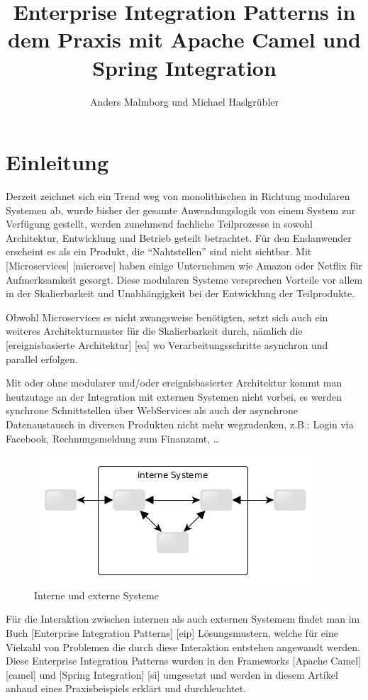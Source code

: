\documentclass[12pt,a4paper,ngerman]{article}
\title{Enterprise Integration Patterns in dem Praxis mit Apache Camel
und Spring Integration}
\author{Anders Malmborg und Michael Haslgrübler}
\date{}
\makeatletter
\def\maxwidth{\ifdim\Gin@nat@width>\linewidth\linewidth
\else\Gin@nat@width\fi}
\let\Oldincludegraphics\includegraphics
\renewcommand{\includegraphics}[1]{\Oldincludegraphics[width=\maxwidth]{#1}}
\makeatother
\begin{document}
\maketitle

\section{Einleitung}

Derzeit zeichnet sich ein Trend weg von monolithischen in Richtung
modularen Systemen ab, wurde bisher der gesamte Anwendungslogik von
einem System zur Verfügung gestellt, werden zunehmend fachliche
Teilprozesse in sowohl Architektur, Entwicklung und Betrieb geteilt
betrachtet. Für den Endanwender erscheint es als ein Produkt, die
``Nahtstellen'' sind nicht sichtbar. Mit {[}Microservices{]}
{[}microsvc{]} haben einige Unternehmen wie Amazon oder Netflix für
Aufmerksamkeit gesorgt. Diese modularen Systeme versprechen Vorteile vor
allem in der Skalierbarkeit und Unabhängigkeit bei der Entwicklung der
Teilprodukte.

Obwohl Microservices es nicht zwangsweise benötigten, setzt sich auch
ein weiteres Architekturmuster für die Skalierbarkeit durch, nämlich die
{[}ereignisbasierte Architektur{]} {[}ea{]} wo Verarbeitungsschritte
asynchron und parallel erfolgen.

Mit oder ohne modularer und/oder ereignisbasierter Architektur kommt man
heutzutage an der Integration mit externen Systemen nicht vorbei, es
werden synchrone Schnittstellen über WebServices als auch der asynchrone
Datenaustausch in diversen Produkten nicht mehr wegzudenken, z.B.: Login
via Facebook, Rechnungsmeldung zum Finanzamt, \ldots{}

\begin{figure}[htbp]
\centering
\includegraphics{systems.png}
\caption{Interne und externe Systeme}
\end{figure}

Für die Interaktion zwischen internen als auch externen Systemem findet
man im Buch {[}Enterprise Integration Patterns{]} {[}eip{]}
Lösungsmustern, welche für eine Vielzahl von Problemen die durch diese
Interaktion entstehen angewandt werden. Diese Enterprise Integration
Patterns wurden in den Frameworks {[}Apache Camel{]} {[}camel{]} und
{[}Spring Integration{]} {[}si{]} umgesetzt und werden in diesem Artikel
anhand eines Praxisbeispiels erklärt und durchleuchtet.
\end{document}
